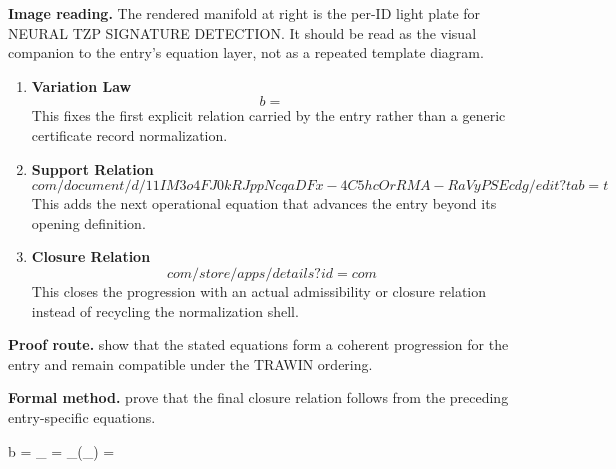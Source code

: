 \begin{samepage}
\noindent\begin{minipage}[t]{0.45\linewidth}
\vspace{0pt}
\raggedright
\scriptsize\textbf{Image reading.} The rendered manifold at right is the per-ID light plate for NEURAL TZP SIGNATURE DETECTION. It should be read as the visual companion to the entry's equation layer, not as a repeated template diagram.\par
\end{minipage}\hfill
\begin{minipage}[t]{0.53\linewidth}
\vspace*{-0.10in}
\raggedright
{}
\end{minipage}
\end{samepage}

\clearpage


\begin{enumerate}[leftmargin=1.6em,itemsep=9pt,topsep=6pt]
\item \textbf{Variation Law}
\[
b =
\]
This fixes the first explicit relation carried by the entry rather than a generic certificate record normalization.

\item \textbf{Support Relation}
\[
com/document/d/11IM3o4FJ0kRJppNcqaDFx-4C5hcOrRMA-RaVyPSEcdg/edit?tab=t
\]
This adds the next operational equation that advances the entry beyond its opening definition.

\item \textbf{Closure Relation}
\[
com/store/apps/details?id=com
\]
This closes the progression with an actual admissibility or closure relation instead of recycling the normalization shell.
\end{enumerate}

\textbf{Proof route.} show that the stated equations form a coherent progression for the entry and remain compatible under the TRAWIN ordering.

\textbf{Formal method.} prove that the final closure relation follows from the preceding entry-specific equations.

\medskip
{}

\begin{tzpsnapshot}
\end{tzpsnapshot}

\tzpequationlinks
  {b =}
  {_{} = \cdots}
  {_{}\!\left(_{}\right) = \cdots}
